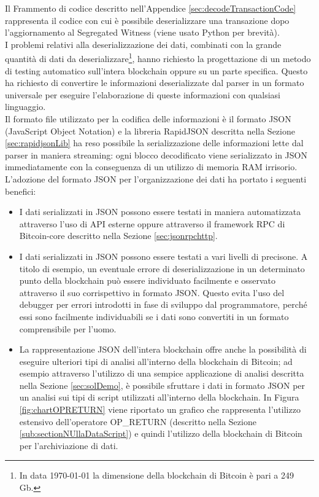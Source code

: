 Il Frammento di codice descritto nell'Appendice \ref{sec:decodeTransactionCode} rappresenta il codice con cui è possibile deserializzare una transazione dopo l'aggiornamento al Segregated Witness (viene usato Python per brevità).\\
I problemi relativi alla deserializzazione dei dati, combinati con la grande quantità di dati da deserializzare\footnote{In data {\today} la dimensione della blockchain di Bitcoin è pari a 249 Gb.}, hanno richiesto la progettazione di un metodo di testing automatico sull'intera blockchain oppure su un parte specifica.
Questo ha richiesto di convertire le informazioni deserializzate dal parser in un formato universale per eseguire l'elaborazione di queste informazioni con qualsiasi linguaggio.\\
Il formato file utilizzato per la codifica delle informazioni è il formato JSON (JavaScript Object Notation) e la libreria RapidJSON descritta nella Sezione \ref{sec:rapidjsonLib} ha reso possibile la serializzazione delle informazioni lette dal parser in maniera streaming: ogni blocco decodificato viene serializzato in JSON immediatamente con la conseguenza di un utilizzo di memoria RAM irrisorio.\\
L'adozione del formato JSON per l'organizzazione dei dati ha portato i seguenti benefici:
\begin{itemize}
  \item I dati serializzati in JSON possono essere testati in maniera automatizzata attraverso l'uso di API esterne oppure attraverso il framework RPC di Bitcoin-core descritto nella Sezione \ref{sec:jsonrpchttp}.
  \item I dati serializzati in JSON possono essere testati a vari livelli di precisone. A titolo di esempio, un eventuale errore di deserializzazione in un determinato punto della blockchain può essere individuato facilmente e osservato attraverso il suo corrispettivo in formato JSON.
  Questo evita l'uso del debugger per errori introdotti in fase di sviluppo dal programmatore, perché essi sono facilmente individuabili se i dati sono convertiti in un formato comprensibile per l'uomo.
  \item La rappresentazione JSON dell'intera blockchain offre anche la possibilità di eseguire ulteriori tipi di analisi all'interno della blockchain di Bitcoin; ad esempio attraverso l'utilizzo di una sempice applicazione di analisi descritta nella Sezione \ref{sec:solDemo}, è possibile sfruttare i dati in formato JSON per un analisi sui tipi di script utilizzati all'interno della blockchain.
  In Figura \ref{fig:chartOPRETURN} viene riportato un grafico che rappresenta l'utilizzo estensivo dell'operatore OP\_RETURN (descritto nella Sezione \ref{sub:sectionNUllaDataScript}) e quindi l'utilizzo della blockchain di Bitcoin per l'archiviazione di dati.
\end{itemize}

